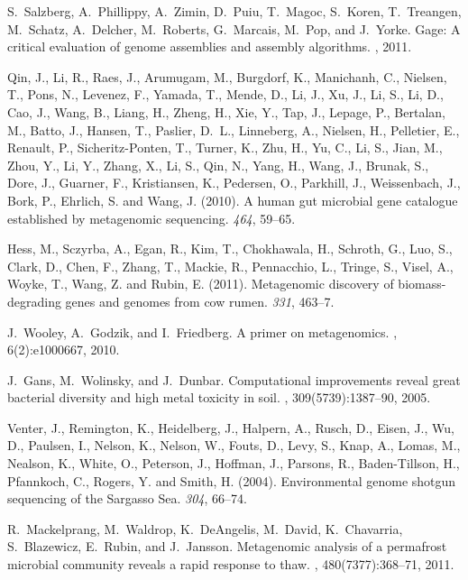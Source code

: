 \documentclass{pnastwo}
\begin{document}
\begin{article}
\begin{thebibliography}{10}
S.~Salzberg, A.~Phillippy, A.~Zimin, D.~Puiu, T.~Magoc, S.~Koren, T.~Treangen,
  M.~Schatz, A.~Delcher, M.~Roberts, G.~Marcais, M.~Pop, and J.~Yorke.
\newblock Gage: A critical evaluation of genome assemblies and assembly
  algorithms.
, 2011.

Qin, J., Li, R., Raes, J., Arumugam, M., Burgdorf, K., Manichanh, C., Nielsen,
  T., Pons, N., Levenez, F., Yamada, T., Mende, D., Li, J., Xu, J., Li, S., Li,
  D., Cao, J., Wang, B., Liang, H., Zheng, H., Xie, Y., Tap, J., Lepage, P.,
  Bertalan, M., Batto, J., Hansen, T., Paslier, D.~L., Linneberg, A., Nielsen,
  H., Pelletier, E., Renault, P., Sicheritz-Ponten, T., Turner, K., Zhu, H.,
  Yu, C., Li, S., Jian, M., Zhou, Y., Li, Y., Zhang, X., Li, S., Qin, N., Yang,
  H., Wang, J., Brunak, S., Dore, J., Guarner, F., Kristiansen, K., Pedersen,
  O., Parkhill, J., Weissenbach, J., Bork, P., Ehrlich, S.  and Wang, J.
  (2010{\rm{}}).
\newblock A human gut microbial gene catalogue established by metagenomic
  sequencing.
 \emph{464}, 59--65.

Hess, M., Sczyrba, A., Egan, R., Kim, T., Chokhawala, H., Schroth, G., Luo, S.,
  Clark, D., Chen, F., Zhang, T., Mackie, R., Pennacchio, L., Tringe, S.,
  Visel, A., Woyke, T., Wang, Z.  and Rubin, E. (2011{\rm{}}).
\newblock Metagenomic discovery of biomass-degrading genes and genomes from cow
  rumen.
 \emph{331}, 463--7.

J.~Wooley, A.~Godzik, and I.~Friedberg.
\newblock A primer on metagenomics.
, 6(2):e1000667, 2010.

J.~Gans, M.~Wolinsky, and J.~Dunbar.
\newblock Computational improvements reveal great bacterial diversity and high
  metal toxicity in soil.
, 309(5739):1387--90, 2005.

Venter, J., Remington, K., Heidelberg, J., Halpern, A., Rusch, D., Eisen, J.,
  Wu, D., Paulsen, I., Nelson, K., Nelson, W., Fouts, D., Levy, S., Knap, A.,
  Lomas, M., Nealson, K., White, O., Peterson, J., Hoffman, J., Parsons, R.,
  Baden-Tillson, H., Pfannkoch, C., Rogers, Y.  and Smith, H. (2004{\rm{}}).
\newblock Environmental genome shotgun sequencing of the Sargasso Sea.
 \emph{304}, 66--74.

R.~Mackelprang, M.~Waldrop, K.~DeAngelis, M.~David, K.~Chavarria, S.~Blazewicz,
  E.~Rubin, and J.~Jansson.
\newblock Metagenomic analysis of a permafrost microbial community reveals a
  rapid response to thaw.
, 480(7377):368--71, 2011.


\end{thebibliography}
\end{article}
\end{document}
